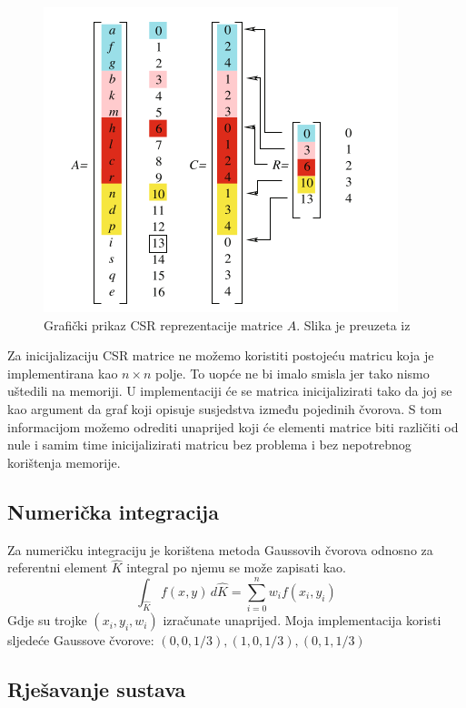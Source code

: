 \documentclass[zavrsnirad]{../fer}
\begin{document}
\begin{figure}[htb]
	\centering
	\includegraphics[width=0.7\linewidth]{Figures/CSR.png}
  \caption{Grafički prikaz CSR reprezentacije matrice $A$. Slika je preuzeta iz \cite{Quarteroni}}
	\label{CSR}
\end{figure}
Za inicijalizaciju CSR matrice ne možemo koristiti postojeću matricu 
koja je implementirana kao $n \times n$ polje. 
To uopće ne bi imalo smisla jer tako nismo uštedili na memoriji.
U implementaciji će se matrica inicijalizirati tako da joj se 
kao argument da graf koji opisuje susjedstva između pojedinih 
čvorova. S tom informacijom možemo odrediti unaprijed koji će 
elementi matrice biti različiti od nule i samim time inicijalizirati 
matricu bez problema i  bez nepotrebnog korištenja memorije.

\subsection{Numerička integracija}
Za numeričku integraciju je korištena metoda Gaussovih 
čvorova odnosno za referentni element $\hat{K}$ integral
po njemu se može zapisati kao.
$$\int_{\hat{K}} f(x,y) \, d\hat{K} = \sum_{i = 0}^n w_i f(x_i,y_i)$$
Gdje su trojke $(x_i, y_i, w_i)$ izračunate unaprijed.
Moja implementacija koristi sljedeće Gaussove čvorove:
$(0,0,1/3), (1,0, 1/3),(0,1,1 / 3)$


\subsection{Rješavanje sustava}
\end{document}
